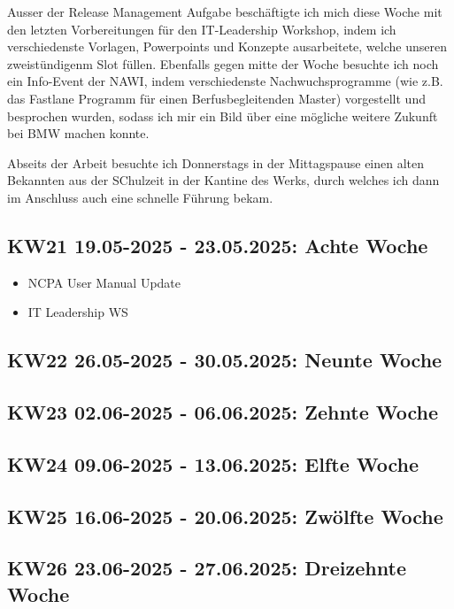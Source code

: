 Ausser der Release Management Aufgabe beschäftigte ich mich diese Woche mit den letzten Vorbereitungen für den IT-Leadership Workshop, indem ich verschiedenste Vorlagen, Powerpoints und Konzepte ausarbeitete, welche unseren zweistündigenm Slot füllen.
Ebenfalls gegen mitte der Woche besuchte ich noch ein Info-Event der \ac{NAWI}, indem verschiedenste Nachwuchsprogramme (wie z.B. das Fastlane Programm für einen Berfusbegleitenden Master) vorgestellt und besprochen wurden, sodass ich mir ein Bild über eine mögliche weitere Zukunft bei BMW machen konnte.

Abseits der Arbeit besuchte ich Donnerstags in der Mittagspause einen alten Bekannten aus der SChulzeit in der Kantine des Werks, durch welches ich dann im Anschluss auch eine schnelle Führung bekam.



\subsection{KW21 19.05-2025 - 23.05.2025: Achte Woche}
\begin{itemize}
  \item NCPA User Manual Update
  \item IT Leadership WS
\end{itemize}

\subsection{KW22 26.05-2025 - 30.05.2025: Neunte Woche}


\subsection{KW23 02.06-2025 - 06.06.2025: Zehnte Woche}


\subsection{KW24 09.06-2025 - 13.06.2025: Elfte Woche}


\subsection{KW25 16.06-2025 - 20.06.2025: Zwölfte Woche}


\subsection{KW26 23.06-2025 - 27.06.2025: Dreizehnte Woche}


